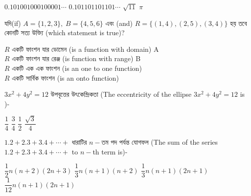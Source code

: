 \documentclass[addpoints]{exam}
\begin{document}
\begin{questions}
\begin{oneparchoices}
\choice $ 0.101001000100001 \cdots $
\choice $ 0.101101101101\cdots $
\choice $ \sqrt{11} $
\choice $ \pi $
\end{oneparchoices}

\question  যদি(if) $ A = \{1,2,3\},\; B=\{4,5,6\}  $ এবং (and) $ R = \{(1,4),(2,5),(3,4)\} $  হয় তবে কোনটি সত্য উক্ত্যি (which statement is true)?


\begin{oneparchoices}

\choice $ R $ একটি ফাংশন যার ডোমেন (is a function with domain) A\\
\choice $ R $ একটি ফাংশন যার রেঞ্জ (is function with range) B\\
\choice $ R $ একটি এক এক ফাংশন (is an one to one function)\\
\choice $ R $ একটি সার্বিক ফাংশন (is an onto function) 
\end{oneparchoices}

\question $ 3x^{2}+4y^{2}=12 $ উপবৃত্তের উৎকেন্দ্রিকতা (The eccentricity of the ellipse $ 3x^{2}+4y^{2}=12 $ is )-

\begin{oneparchoices}
\choice $ \dfrac{1}{4} $
\choice $ \dfrac{3}{4} $
\choice $ \dfrac{1}{2} $
\choice $ \dfrac{\sqrt{3}}{4} $

\end{oneparchoices}

\question $ 1.2+2.3+3.4+\cdots + $ ধারাটির $ n- $তম পদ পর্যন্ত যোগফল (The sum of the series $ 1.2+2.3+3.4+\cdots + $ to $ n- $th term is)-

\begin{oneparchoices}
\choice $ \dfrac{1}{2}n(n+2)(2n+3)$
\choice $ \dfrac{1}{3}n(n+1)(n+2)$
\choice $ \dfrac{1}{3}n(n+1)(2n+1)$
\choice $ \dfrac{1}{12}n(n+1)(2n+1)$
\end{oneparchoices}
\end{questions}
\end{document}
